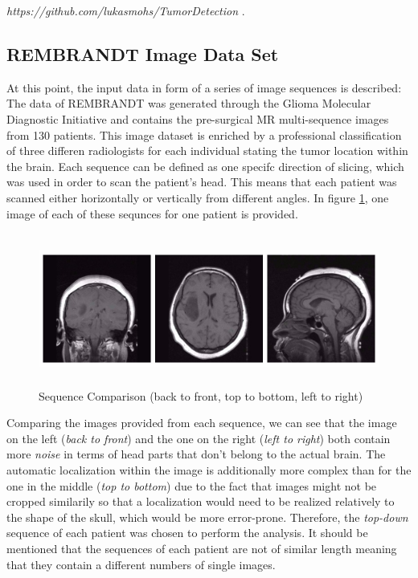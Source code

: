 \documentclass[twoside,11pt]{article}
\begin{document}
\textit{https://github.com/lukasmohs/TumorDetection} .

\subsection{REMBRANDT Image Data Set}
At this point, the input data in form of a series of image sequences is described: 
The data of REMBRANDT was generated through the Glioma Molecular Diagnostic Initiative and contains the pre-surgical MR multi-sequence images from 130 patients. This image dataset is enriched by a professional classification of three differen radiologists for each individual stating the tumor location within the brain. Each sequence can be defined as one specifc direction of slicing, which was used in order to scan the patient's head. This means that each patient was scanned either  horizontally or vertically from different angles. In figure \ref{fig:sequences}, one image of each of these sequnces for one patient is provided. \citep{cite3}

\begin{figure}
	\label{fig:sequences}
	\centering
	\includegraphics[height=5cm]{sequences}
	\caption{Sequence Comparison (back to front, top to bottom, left to right)}
\end{figure}%

Comparing the images provided from each sequence, we can see that the image on the left  (\textit{back to front}) and the one on the right (\textit{left to right}) both contain more \textit{noise} in terms of head parts that don't belong to the actual brain. The automatic localization within the image is additionally more complex than for the one in the middle (\textit{top to bottom}) due to the fact that images might not be cropped similarily so that a localization would need to be realized relatively to the shape of the skull, which would be more error-prone.
Therefore, the \textit{top-down} sequence of each patient was chosen to perform the analysis. It should be mentioned that the sequences of each patient are not of similar length meaning that they contain a different numbers of single images.
\end{document}
